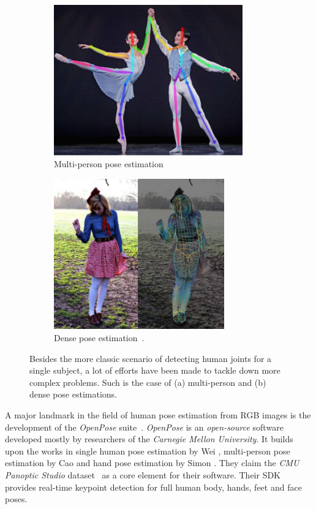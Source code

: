 \begin{figure}[h]\centering
    \begin{subfigure}{0.53\textwidth}\centering
        \includegraphics[height=6.5cm]{figures/multiperson.jpg} 
        \caption{Multi-person pose estimation~\cite{cao2018openpose}}
        \label{subfig:multiperson}
    \end{subfigure}
    \begin{subfigure}{0.46\textwidth}\centering
        \includegraphics[height=6.5cm]{figures/dense.jpg}
        \caption{Dense pose estimation~\cite{Alp_Guler2018-rg}.}
        \label{subfig:dense}
    \end{subfigure}
    \caption{Besides the more classic scenario of detecting human joints for a single subject, a lot of efforts have been made to tackle down more complex problems. Such is the case of (a) multi-person and (b) dense pose estimations.}
    \label{fig:multiperson_and_dense}
\end{figure}

A major landmark in the field of human pose estimation from RGB images is the development of the \emph{OpenPose} suite~\cite{cao2018openpose}. \emph{OpenPose} is an \emph{open-source} software developed mostly by researchers of the \emph{Carnegie Mellon University}. It builds upon the works in single human pose estimation by Wei \etal\cite{Wei2016-rb}, multi-person pose estimation by Cao \etal\cite{cao2018openpose} and hand pose estimation by Simon \etal\cite{simon2017hand}. They claim the \emph{CMU Panoptic Studio} dataset~\cite{joo2015panoptic} as a core element for their software. Their SDK provides real-time keypoint detection for full human body, hands, feet and face poses.

